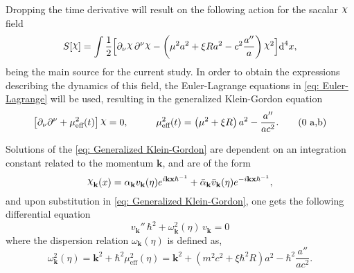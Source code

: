 Dropping the time derivative will result on the following action for the sacalar $\rchi$ field
\begin{equation}
	S[\rchi]=\int\frac{1}{2}\Big[\partial_\nu\rchi\,\partial^\nu\rchi-\left(\mu^2a^2+\xi R a^2-c^2\frac{a''}{a}\right)\rchi^2\Big]\td^4 x,
\end{equation}
being the main source for the current study. In order to obtain the expressions describing the dynamics of this field, the Euler-Lagrange equations in \cref{eq: Euler-Lagrange} will be used, resulting in the generalized Klein-Gordon equation
\begin{subequations}\label{eq: Generalized Klein-Gordon}
	\begin{gather}
		\left[\partial_\nu\partial^\nu+\mu_{\text{eff}}^2(t)\right]\rchi=0,\hspace{1.0cm}\mu_{\text{eff}}^2(t)=\left(\mu^2+\xi R\right)a^2-\frac{a''}{ac^2}.\tag{\theequation \,\,a,b}
	\end{gather}
\end{subequations}

Solutions of the \cref{eq: Generalized Klein-Gordon} are dependent on an integration constant related to the momentum $\mathbf{k}$, and are of the form
\begin{equation}
	\rchi_{\mathbf{k}}(x)=\alpha_\mathbf{k}v_\mathbf{k}(\eta)e^{ i\mathbf{kx}\hbar^{-1}}+\bar\alpha_\mathbf{k}\bar v_\mathbf{k}(\eta)e^{- i\mathbf{kx}\hbar^{-1}},
\end{equation}
and upon substitution in \eqref{eq: Generalized Klein-Gordon}, one gets the following differential equation
\begin{equation}\label{eq: Expanding diff v}
	v_\mathbf{k}''\,\hbar^2+\omega^2_\mathbf{k}(\eta)\,v_\mathbf{k}=0
\end{equation}
where the dispersion relation $\omega_\mathbf{k}(\eta)$ is defined as,
\begin{equation}\label{eq: Expanding dispersion relation}
	\omega^2_{\mathbf k}(\eta)=\mathbf{k}^2+\hbar^2\mu_{\text{eff}}^2(\eta)=\mathbf{k}^2+\left(m^2c^2+\xi\hbar^2 R\right)a^2-\hbar^2\frac{a''}{ac^2}.
\end{equation}

